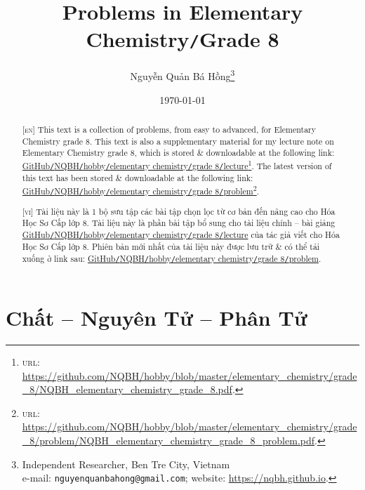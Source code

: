 \documentclass{article}
\title{Problems in Elementary Chemistry\texttt{/}Grade 8}
\author{Nguyễn Quản Bá Hồng\footnote{Independent Researcher, Ben Tre City, Vietnam\\e-mail: \texttt{nguyenquanbahong@gmail.com}; website: \url{https://nqbh.github.io}.}}
\date{\today}
\numberwithin{equation}{section}
\begin{document}
\maketitle
\begin{abstract}
	\textsc{[en]} This text is a collection of problems, from easy to advanced, for Elementary Chemistry grade 8. This text is also a supplementary material for my lecture note on Elementary Chemistry grade 8, which is stored \& downloadable at the following link: \href{https://github.com/NQBH/hobby/blob/master/elementary_chemistry/grade_8/NQBH_elementary_chemistry_grade_8.pdf}{GitHub\texttt{/}NQBH\texttt{/}hobby\texttt{/}elementary chemistry\texttt{/}grade 8\texttt{/}lecture}\footnote{\textsc{url}: \url{https://github.com/NQBH/hobby/blob/master/elementary_chemistry/grade_8/NQBH_elementary_chemistry_grade_8.pdf}.}. The latest version of this text has been stored \& downloadable at the following link: \href{https://github.com/NQBH/hobby/blob/master/elementary_chemistry/grade_8/problem/NQBH_elementary_chemistry_grade_8_problem.pdf}{GitHub\texttt{/}NQBH\texttt{/}hobby\texttt{/}elementary chemistry\texttt{/}grade 8\texttt{/}problem}\footnote{\textsc{url}: \url{https://github.com/NQBH/hobby/blob/master/elementary_chemistry/grade_8/problem/NQBH_elementary_chemistry_grade_8_problem.pdf}.}.
	\vspace{2mm}
	
	\textsc{[vi]} Tài liệu này là 1 bộ sưu tập các bài tập chọn lọc từ cơ bản đến nâng cao cho Hóa Học Sơ Cấp lớp 8. Tài liệu này là phần bài tập bổ sung cho tài liệu chính -- bài giảng \href{https://github.com/NQBH/hobby/blob/master/elementary_chemistry/grade_8/NQBH_elementary_chemistry_grade_8.pdf}{GitHub\texttt{/}NQBH\texttt{/}hobby\texttt{/}elementary chemistry\texttt{/}grade 8\texttt{/}lecture} của tác giả viết cho Hóa Học Sơ Cấp lớp 8. Phiên bản mới nhất của tài liệu này được lưu trữ \& có thể tải xuống ở link sau: \href{https://github.com/NQBH/hobby/blob/master/elementary_chemistry/grade_8/problem/NQBH_elementary_chemistry_grade_8_problem.pdf}{GitHub\texttt{/}NQBH\texttt{/}hobby\texttt{/}elementary chemistry\texttt{/}grade 8\texttt{/}problem}.
\end{abstract}
\tableofcontents
\newpage


\section{Chất -- Nguyên Tử -- Phân Tử}
\end{document}

